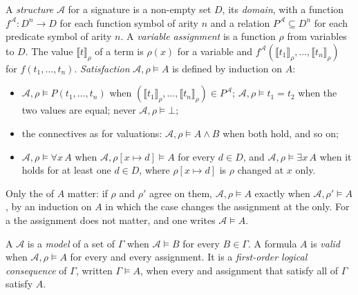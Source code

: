 \begin{definition}\label{def:b2:predicate-logic:structure}
A \emph{structure} $\mathcal{A}$ for a signature is a non-empty set $D$, its \emph{domain},
with a function $f^{\mathcal{A}} : D^n \to D$ for each function symbol of arity $n$ and a relation $P^{\mathcal{A}}
\subseteq D^n$ for each predicate symbol of arity $n$. A \emph{variable assignment} is a
function $\rho$ from variables to $D$. The value $\llbracket t \rrbracket_\rho$ of a term is $\rho(x)$ for a variable
and $f^{\mathcal{A}}(\llbracket t_1 \rrbracket_\rho, \dots, \llbracket t_n \rrbracket_\rho)$ for $f(t_1, \dots, t_n)$.
\emph{Satisfaction} $\mathcal{A}, \rho \models A$ is defined by induction on $A$:
\begin{itemize}
\item $\mathcal{A}, \rho \models P(t_1, \dots, t_n)$ when $(\llbracket t_1 \rrbracket_\rho, \dots, \llbracket t_n
\rrbracket_\rho) \in P^{\mathcal{A}}$; $\mathcal{A}, \rho \models t_1 = t_2$ when the two values are equal; never
$\mathcal{A}, \rho \models \bot$;
\item the connectives as for valuations: $\mathcal{A}, \rho \models A \wedge B$ when both hold, and so on;
\item $\mathcal{A}, \rho \models \forall x\, A$ when $\mathcal{A}, \rho[x \mapsto d] \models A$ for every $d \in D$,
and $\mathcal{A}, \rho \models \exists x\, A$ when it holds for at least one $d \in D$, where $\rho[x \mapsto d]$ is
$\rho$ changed at $x$ only.
\end{itemize}
\end{definition}

Only the  of $A$ matter: if $\rho$ and $\rho'$ agree on them, $\mathcal{A}, \rho \models A$ exactly when
$\mathcal{A}, \rho' \models A$, by an induction on $A$ in which the  case changes the assignment at the  only. For a  the assignment does not matter, and one writes $\mathcal{A} \models A$.

\begin{definition}\label{def:b2:predicate-logic:consequence}
A  $\mathcal{A}$ is a \emph{model} of a set of  $\Gamma$ when
$\mathcal{A} \models B$ for every $B \in \Gamma$. A formula $A$ is \emph{valid} when
$\mathcal{A}, \rho \models A$ for every  and every assignment. It is a \emph{first-order logical
consequence} of $\Gamma$, written $\Gamma \models A$, when every  and
assignment that satisfy all of $\Gamma$ satisfy $A$.
\end{definition}

